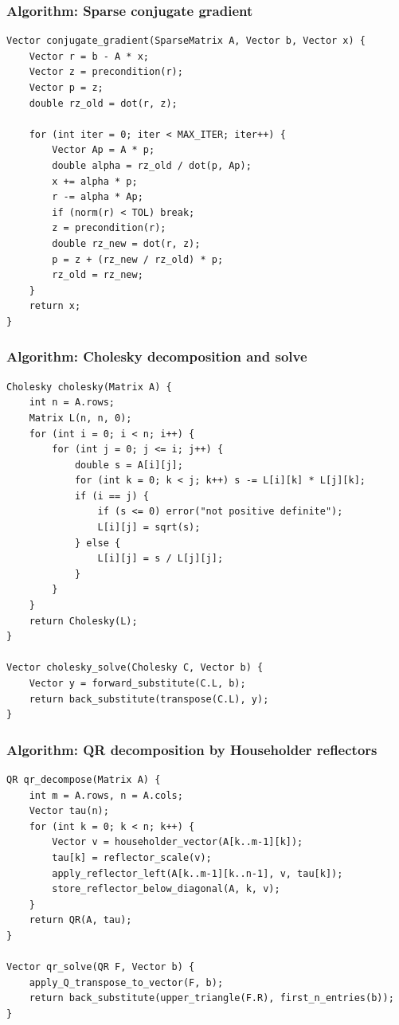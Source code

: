 \documentclass[11pt]{article}
\begin{document}
\subsubsection{Algorithm: Sparse conjugate gradient}\label{algorithm-sparse-conjugate-gradient}

\begin{verbatim}
Vector conjugate_gradient(SparseMatrix A, Vector b, Vector x) {
    Vector r = b - A * x;
    Vector z = precondition(r);
    Vector p = z;
    double rz_old = dot(r, z);

    for (int iter = 0; iter < MAX_ITER; iter++) {
        Vector Ap = A * p;
        double alpha = rz_old / dot(p, Ap);
        x += alpha * p;
        r -= alpha * Ap;
        if (norm(r) < TOL) break;
        z = precondition(r);
        double rz_new = dot(r, z);
        p = z + (rz_new / rz_old) * p;
        rz_old = rz_new;
    }
    return x;
}
\end{verbatim}

\subsubsection{Algorithm: Cholesky decomposition and solve}\label{algorithm-cholesky-decomposition-and-solve}

\begin{verbatim}
Cholesky cholesky(Matrix A) {
    int n = A.rows;
    Matrix L(n, n, 0);
    for (int i = 0; i < n; i++) {
        for (int j = 0; j <= i; j++) {
            double s = A[i][j];
            for (int k = 0; k < j; k++) s -= L[i][k] * L[j][k];
            if (i == j) {
                if (s <= 0) error("not positive definite");
                L[i][j] = sqrt(s);
            } else {
                L[i][j] = s / L[j][j];
            }
        }
    }
    return Cholesky(L);
}

Vector cholesky_solve(Cholesky C, Vector b) {
    Vector y = forward_substitute(C.L, b);
    return back_substitute(transpose(C.L), y);
}
\end{verbatim}

\subsubsection{Algorithm: QR decomposition by Householder reflectors}\label{algorithm-qr-decomposition-by-householder-reflectors}

\begin{verbatim}
QR qr_decompose(Matrix A) {
    int m = A.rows, n = A.cols;
    Vector tau(n);
    for (int k = 0; k < n; k++) {
        Vector v = householder_vector(A[k..m-1][k]);
        tau[k] = reflector_scale(v);
        apply_reflector_left(A[k..m-1][k..n-1], v, tau[k]);
        store_reflector_below_diagonal(A, k, v);
    }
    return QR(A, tau);
}

Vector qr_solve(QR F, Vector b) {
    apply_Q_transpose_to_vector(F, b);
    return back_substitute(upper_triangle(F.R), first_n_entries(b));
}
\end{verbatim}
\end{document}
